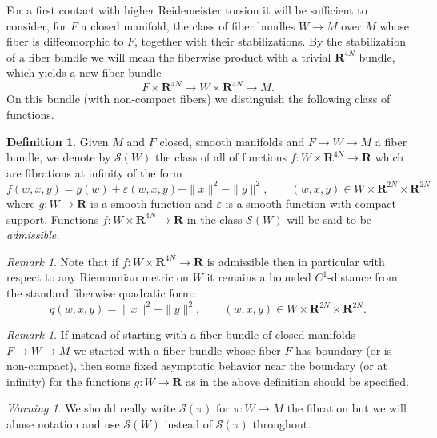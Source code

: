 \documentclass{amsart}
\def\bR{\mathbf{R}}
\theoremstyle{definition}
\newtheorem{definition}[theorem]{Definition}
\theoremstyle{remark}
\newtheorem{inductive lemma}[theorem]{Inductive Lemma}
\newtheorem{remark}[theorem]{Remark}
\newtheorem{warning}[theorem]{Warning}
\begin{document}
For a first contact with higher Reidemeister torsion it will be sufficient to consider, for $F$ a closed manifold, the class of fiber bundles $W \to M$ over $M$ whose fiber is diffeomorphic to $F$, together with their stabilizations. By the stabilization of a fiber bundle we will mean the fiberwise product with a trivial $\bR^{4N}$ bundle, which yields a new fiber bundle
$$ F \times \bR^{4N} \to W \times \bR^{4N} \to M.$$
On this bundle (with non-compact fibers) we distinguish the following class of functions.

\begin{definition}\label{def: class}
Given $M$ and $F$ closed, smooth manifolds and $F \to W \to M$ a fiber bundle, we denote by $\mathcal{S}(W)$ the class of all of functions $f:W \times \bR^{4N} \to \bR$ which are fibrations at infinity of the form
$$
f(w, x, y) = g(w) + \varepsilon(w,x,y) + \|x\|^2 - \|y\|^2, \qquad (w,x,y) \in W \times  \bR^{2N} \times \bR^{2N} 
$$
where $g:W \to \bR$ is a smooth function and $\varepsilon$ is a smooth function with compact support. Functions $f:W \times \bR^{4N} \to \bR$ in the class $\mathcal{S}(W)$ will be said to be {\em{admissible.}}
\end{definition}

\begin{remark} Note that if $f:W \times \bR^{4N} \to \bR$ is admissible then in particular with respect to any Riemannian metric on $W$ it remains a bounded $C^1$-distance from the standard fiberwise quadratic form: $$q(w, x,y) = \|x\|^2-\|y\|^2, \qquad (w,x,y) \in W \times  \bR^{2N} \times \bR^{2N}.$$ \end{remark}

\begin{remark}
If instead of starting with a fiber bundle of closed manifolds $F \to W \to M$ we started with a fiber bundle whose fiber $F$ has boundary (or is non-compact), then some fixed asymptotic behavior near the boundary (or at infinity) for the functions $g:W \to \bR$ as in the above definition should be specified. %
\end{remark}






\begin{warning} We should really write $\mathcal{S}(\pi)$ for $\pi:W \to M$ the fibration but we will abuse notation and use $\mathcal{S}(W)$  instead of $\mathcal{S}(\pi)$ throughout. \end{warning} 
\end{document}
